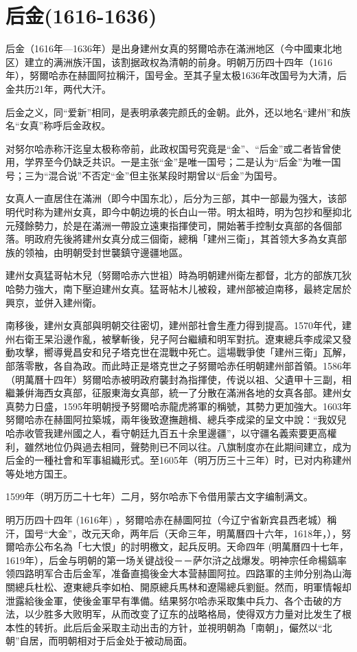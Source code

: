 
\section{后金\tiny(1616-1636)}

后金（1616年—1636年）是出身建州女真的努爾哈赤在滿洲地区（今中國東北地区）建立的满洲族汗国，该割据政权為清朝的前身。明朝万历四十四年（1616年），努爾哈赤在赫圖阿拉稱汗，国号金。至其子皇太极1636年改国号为大清，后金共历21年，两代大汗。

后金之义，同“爱新”相同，是表明承袭完颜氏的金朝。此外，还以地名“建州”和族名“女真”称呼后金政权。

对努尔哈赤称汗迄皇太极称帝前，此政权国号究竟是“金”、“后金”或二者皆曾使用，学界至今仍缺乏共识。一是主张“金”是唯一国号；二是认为“后金”为唯一国号；三为“混合说”不否定“金”但主张某段时期曾以“后金”为国号。

女真人一直居住在滿洲（即今中国东北），后分为三部，其中一部最为强大，该部明代时称为建州女真，即今中朝边境的长白山一带。明太祖時，明为包抄和壓抑北元殘餘勢力，於是在滿洲一帶設立遠東指揮使司，開始著手控制女真部的各個部落。明政府先後將建州女真分成三個衛，總稱「建州三衛」，其首领大多為女真部族的领袖，由明朝受封世襲鎮守邊疆地區。

建州女真猛哥帖木兒（努爾哈赤六世祖）時為明朝建州衛左都督，北方的部族兀狄哈勢力強大，南下壓迫建州女真。猛哥帖木儿被殺，建州部被迫南移，最終定居於興京，並併入建州衛。

南移後，建州女真部與明朝交往密切，建州部社會生產力得到提高。1570年代，建州右衛王杲沿邊作亂，被擊斬後，兒子阿台繼續和明军對抗。遼東總兵李成梁又發動攻擊，嚮導覺昌安和兒子塔克世在混戰中死亡。這場戰爭使「建州三衛」瓦解，部落零散，各自為政。而此時正是塔克世之子努爾哈赤任明朝建州部首領。1586年（明萬曆十四年）努爾哈赤被明政府襲封為指揮使，传说以祖、父遺甲十三副，相繼兼倂海西女真部，征服東海女真部，統一了分散在滿洲各地的女真各部。建州女真勢力日盛，1595年明朝授予努爾哈赤龍虎將軍的稱號，其勢力更加強大。1603年努爾哈赤在赫圖阿拉築城，兩年後致遼撫趙楫、總兵李成梁的呈文中說：“我奴兒哈赤收管我建州國之人，看守朝廷九百五十余里邊疆”，以守疆名義索要更高權利，雖然地位仍與過去相同，聲勢則已不同以往。八旗制度亦在此期间建立，成为后金的一種社會和军事組織形式。至1605年（明万历三十三年）时，已对内称建州等处地方国王。

1599年（明万历二十七年）二月，努尔哈赤下令借用蒙古文字编制满文。

明万历四十四年 (1616年) ，努爾哈赤在赫圖阿拉（今辽宁省新宾县西老城）稱汗，国号“大金”，改元天命，两年后（天命三年，明萬曆四十六年，1618年，），努爾哈赤公布名為「七大恨」的討明檄文，起兵反明。天命四年 (明萬曆四十七年，1619年），后金与明朝的第一场关键战役－－萨尔浒之战爆发。明神宗任命楊鎬率领四路明军合击后金军，准备直搗後金大本营赫圖阿拉。四路軍的主帅分别為山海關總兵杜松、遼東總兵李如柏、開原總兵馬林和遼陽總兵劉鋌。然而，明軍情報却泄露給後金軍，使後金軍早有準備。结果努尔哈赤采取集中兵力、各个击破的方法，以少胜多大败明军，从而改变了辽东的战略格局，使得双方力量对比发生了根本性的转折。此后后金采取主动出击的方针，並視明朝為「南朝」，儼然以“北朝”自居，而明朝相对于后金处于被动局面。

